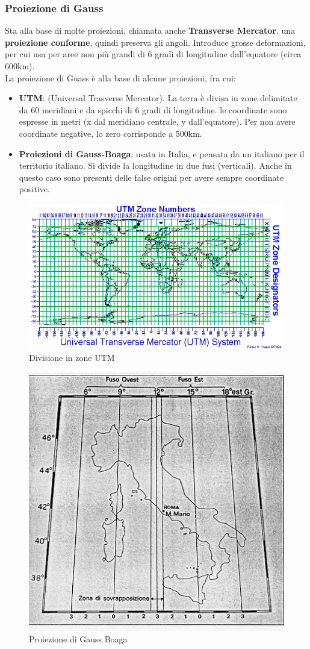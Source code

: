 \documentclass[a4paper,12pt]{article}
\begin{document}
\subsubsection{Proiezione di Gauss}
Sta alla base di molte proiezioni, chiamata anche \textbf{Transverse Mercator}. \E una \textbf{proiezione conforme}, quindi preserva gli angoli. Introduce grosse deformazioni, per cui usa per aree non più grandi di 6 gradi di longitudine dall'equatore (circa 600km).\\
La proiezione di Guass è alla base di alcune proiezioni, fra cui:
\begin{itemize}
\item \textbf{UTM}: (Universal Trasverse Mercator). La terra è divisa in zone delimitate da 60 meridiani e da spicchi di 6 gradi di longitudine. le coordinate sono espresse in metri (x dal meridiano centrale, y dall'equatore). Per non avere coordinate negative, lo zero corrisponde a 500km.
\item \textbf{Proiezioni di Gauss-Boaga}: usata in Italia, e pensata da un italiano per il territorio italiano. Si divide la longitudine in due fusi (verticali). Anche in questo caso sono presenti delle false origini per avere sempre coordinate positive.
\end{itemize}

\begin{figure}[H]
	\centering
	\includegraphics[width=\linewidth]{Immagini/UTM}
	\caption{Divisione in zone UTM}
\end{figure}

\begin{figure}[H]
	\centering
	\includegraphics[width=0.6\linewidth]{Immagini/GaussBoaga}
	\caption{Proiezione di Gauss Boaga}
\end{figure}
\end{document}
